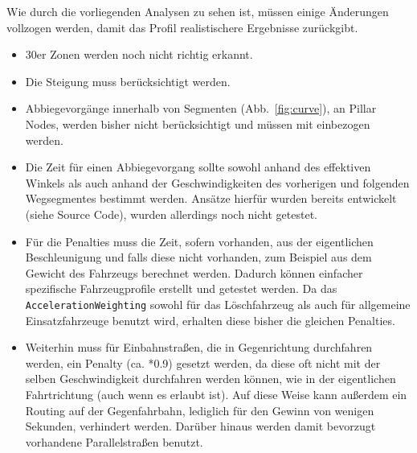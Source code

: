 Wie durch die vorliegenden Analysen zu sehen ist, müssen einige Änderungen vollzogen werden, damit das Profil realistischere Ergebnisse zurückgibt.\par
\begin{itemize}
\item 30er Zonen werden noch nicht richtig erkannt.
\item Die Steigung muss berücksichtigt werden.
\item Abbiegevorgänge innerhalb von Segmenten (Abb.~\ref{fig:curve}), an Pillar Nodes, werden bisher nicht berücksichtigt und müssen mit einbezogen werden.
\item Die Zeit für einen Abbiegevorgang sollte sowohl anhand des effektiven Winkels als auch anhand der Geschwindigkeiten des vorherigen und folgenden Wegsegmentes bestimmt werden.
Ansätze hierfür wurden bereits entwickelt (siehe Source Code), wurden allerdings noch nicht getestet.
\item Für die Penalties muss die Zeit, sofern vorhanden, aus der eigentlichen Beschleunigung und falls diese nicht vorhanden, zum Beispiel aus dem Gewicht des Fahrzeugs berechnet werden.
Dadurch können einfacher spezifische Fahrzeugprofile erstellt und getestet werden.
Da das \texttt{AccelerationWeighting} sowohl für das Löschfahrzeug als auch für allgemeine Einsatzfahrzeuge benutzt wird, erhalten diese bisher die gleichen Penalties.
\item Weiterhin muss für Einbahnstraßen, die in Gegenrichtung durchfahren werden, ein Penalty (ca. *0.9) gesetzt werden, da diese oft nicht mit der selben Geschwindigkeit durchfahren werden können, wie in der eigentlichen Fahrtrichtung (auch wenn es erlaubt ist).
Auf diese Weise kann außerdem ein Routing auf der Gegenfahrbahn, lediglich für den Gewinn von wenigen Sekunden, verhindert werden.
Darüber hinaus werden damit bevorzugt vorhandene Parallelstraßen benutzt.
\end{itemize}